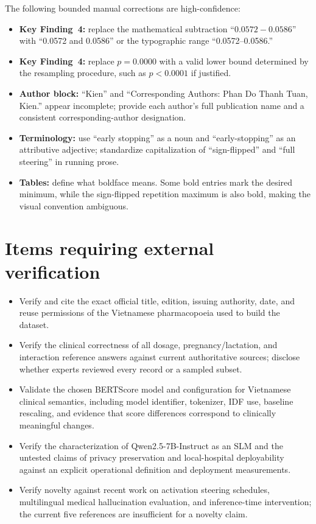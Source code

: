 \documentclass[11pt]{article}
\begin{document}
The following bounded manual corrections are high-confidence:
\begin{itemize}
    \item \textbf{Key Finding~4:} replace the mathematical subtraction ``$0.0572 - 0.0586$'' with ``0.0572 and 0.0586'' or the typographic range ``0.0572--0.0586.''
    \item \textbf{Key Finding~4:} replace $p=0.0000$ with a valid lower bound determined by the resampling procedure, such as $p<0.0001$ if justified.
    \item \textbf{Author block:} ``Kien'' and ``Corresponding Authors: Phan Do Thanh Tuan, Kien.'' appear incomplete; provide each author's full publication name and a consistent corresponding-author designation.
    \item \textbf{Terminology:} use ``early stopping'' as a noun and ``early-stopping'' as an attributive adjective; standardize capitalization of ``sign-flipped'' and ``full steering'' in running prose.
    \item \textbf{Tables:} define what boldface means.  Some bold entries mark the desired minimum, while the sign-flipped repetition maximum is also bold, making the visual convention ambiguous.
\end{itemize}

\section*{Items requiring external verification}

\begin{itemize}
    \item Verify and cite the exact official title, edition, issuing authority, date, and reuse permissions of the Vietnamese pharmacopoeia used to build the dataset.
    \item Verify the clinical correctness of all dosage, pregnancy/lactation, and interaction reference answers against current authoritative sources; disclose whether experts reviewed every record or a sampled subset.
    \item Validate the chosen BERTScore model and configuration for Vietnamese clinical semantics, including model identifier, tokenizer, IDF use, baseline rescaling, and evidence that score differences correspond to clinically meaningful changes.
    \item Verify the characterization of Qwen2.5-7B-Instruct as an SLM and the untested claims of privacy preservation and local-hospital deployability against an explicit operational definition and deployment measurements.
    \item Verify novelty against recent work on activation steering schedules, multilingual medical hallucination evaluation, and inference-time intervention; the current five references are insufficient for a novelty claim.
\end{itemize}
\end{document}
